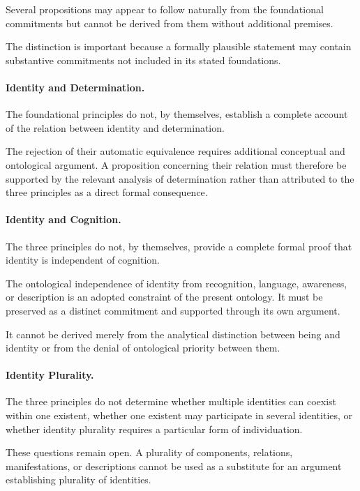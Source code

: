 Several propositions may appear to follow naturally from
the foundational commitments but cannot be derived from
them without additional premises.

The distinction is important because a formally plausible
statement may contain substantive commitments not included
in its stated foundations.

\paragraph{Identity and Determination.}

The foundational principles do not, by themselves, establish
a complete account of the relation between identity and
determination.

The rejection of their automatic equivalence requires
additional conceptual and ontological argument. A proposition
concerning their relation must therefore be supported by
the relevant analysis of determination rather than attributed
to the three principles as a direct formal consequence.

\paragraph{Identity and Cognition.}

The three principles do not, by themselves, provide a complete
formal proof that identity is independent of cognition.

The ontological independence of identity from recognition,
language, awareness, or description is an adopted constraint
of the present ontology. It must be preserved as a distinct
commitment and supported through its own argument.

It cannot be derived merely from the analytical distinction
between being and identity or from the denial of ontological
priority between them.

\paragraph{Identity Plurality.}

The three principles do not determine whether multiple
identities can coexist within one existent, whether one
existent may participate in several identities, or whether
identity plurality requires a particular form of individuation.

These questions remain open. A plurality of components,
relations, manifestations, or descriptions cannot be used
as a substitute for an argument establishing plurality of
identities.

